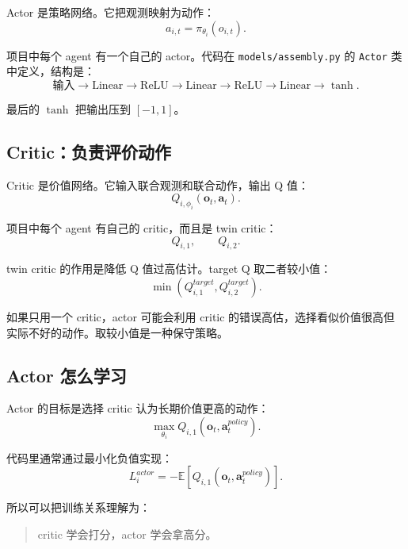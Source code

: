 \documentclass[UTF8,zihao=-4]{ctexart}
\begin{document}
Actor 是策略网络。它把观测映射为动作：
\begin{equation}
a_{i,t}=\pi_{\theta_i}(o_{i,t}).
\end{equation}

项目中每个 agent 有一个自己的 actor。代码在 \texttt{models/assembly.py} 的 \texttt{Actor} 类中定义，结构是：
\begin{equation}
\text{输入}
\rightarrow
\text{Linear}
\rightarrow
\text{ReLU}
\rightarrow
\text{Linear}
\rightarrow
\text{ReLU}
\rightarrow
\text{Linear}
\rightarrow
\tanh.
\end{equation}

最后的 $\tanh$ 把输出压到 $[-1,1]$。

\subsection{Critic：负责评价动作}

Critic 是价值网络。它输入联合观测和联合动作，输出 Q 值：
\begin{equation}
Q_{i,\phi_i}(\bm{o}_t,\bm{a}_t).
\end{equation}

项目中每个 agent 有自己的 critic，而且是 twin critic：
\begin{equation}
Q_{i,1},\qquad Q_{i,2}.
\end{equation}

twin critic 的作用是降低 Q 值过高估计。target Q 取二者较小值：
\begin{equation}
\min(Q_{i,1}^{target},Q_{i,2}^{target}).
\end{equation}

如果只用一个 critic，actor 可能会利用 critic 的错误高估，选择看似价值很高但实际不好的动作。取较小值是一种保守策略。

\subsection{Actor 怎么学习}

Actor 的目标是选择 critic 认为长期价值更高的动作：
\begin{equation}
\max_{\theta_i}
Q_{i,1}(\bm{o}_t,\bm{a}^{policy}_t).
\end{equation}

代码里通常通过最小化负值实现：
\begin{equation}
L^{actor}_i
=
-
\mathbb{E}
\left[
Q_{i,1}(\bm{o}_t,\bm{a}^{policy}_t)
\right].
\end{equation}

所以可以把训练关系理解为：
\begin{quote}
critic 学会打分，actor 学会拿高分。
\end{quote}
\end{document}
